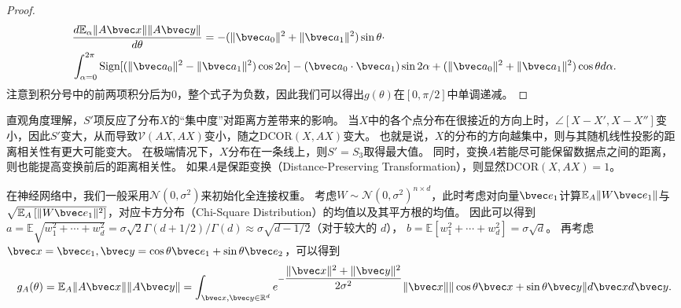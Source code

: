 \begin{proof}
\begin{equation}
        \begin{split}
            & \dfrac{d\mathbb E_\alpha \Vert A\bvec x \Vert \Vert A\bvec y \Vert}{d\theta} = 
            -(\Vert \bvec a_0 \Vert^2 + \Vert \bvec a_1 \Vert^2)\sin \theta \cdot \\
            & \int_{\alpha=0}^{2\pi} 
                \text{Sign}[(\Vert \bvec a_0 \Vert^2 - \Vert\bvec a_1\Vert^2)\cos 2 \alpha] - 
                (\bvec a_0 \cdot \bvec a_1) \sin 2\alpha + 
                (\Vert \bvec a_0 \Vert^2 + \Vert\bvec a_1\Vert^2) \cos \theta d\alpha.
        \end{split}
    \end{equation}
    注意到积分号中的前两项积分后为0，整个式子为负数，因此我们可以得出$g(\theta)$在$[0, \pi/2]$中单调递减。
\end{proof}

直观角度理解，$S'$项反应了分布$X$的“集中度”对距离方差带来的影响。
%
当$X$中的各个点分布在很接近的方向上时，$\angle[X - X', X - X'']$变小，因此$S'$变大，从而导致$\mathcal{V}(AX, AX)$变小，随之$\text{DCOR}(X, AX)$变大。
%
也就是说，$X$的分布的方向越集中，则与其随机线性投影的距离相关性有更大可能变大。
%
在极端情况下，$X$分布在一条线上，则$S' = S_3$取得最大值。
%
同时，变换$A$若能尽可能保留数据点之间的距离，则也能提高变换前后的距离相关性。
%
如果$A$是保距变换（Distance-Preserving Transformation），则显然$\text{DCOR}(X, AX) = 1$。


%
在神经网络中，我们一般采用$\mathcal N(0, \sigma^2)$来初始化全连接权重。
%
考虑$W \sim \mathcal N(0, \sigma^2)^{n \times d}$，此时考虑对向量$\bvec e_1$计算$\mathbb E_A \Vert W\bvec e_1 \Vert$与$\sqrt{\mathbb E_A \left[\Vert W\bvec e_1 \Vert^2 \right]}$，对应卡方分布（Chi-Square Distribution）的均值以及其平方根的均值。
%
因此可以得到
$a = \mathbb E \sqrt{w_1^2 + \cdots + w_d^2} = \sigma \sqrt{2} \Gamma(d + 1/2) / \Gamma(d) \approx \sigma \sqrt{d - 1/2}$（对于较大的 $d$），
$b = \mathbb E \left[ {w_1^2 + \cdots + w_d^2} \right] = \sigma\sqrt{d}$。
%
再考虑$\bvec x = \bvec e_1, \bvec y = \cos \theta \bvec e_1 + \sin \theta \bvec e_2$，可以得到
\begin{equation}
    g_A(\theta) = \mathbb E_A \Vert A\bvec x \Vert \Vert A \bvec y \Vert = \int_{\bvec x, \bvec y \in \mathbb R^d} e^{-\dfrac{\Vert \bvec x \Vert^2 + \Vert \bvec y \Vert^2}{2\sigma^2}}
\Vert \bvec x \Vert \Vert \cos \theta \bvec x + \sin \theta \bvec y \Vert d\bvec x d\bvec y.
\end{equation}

